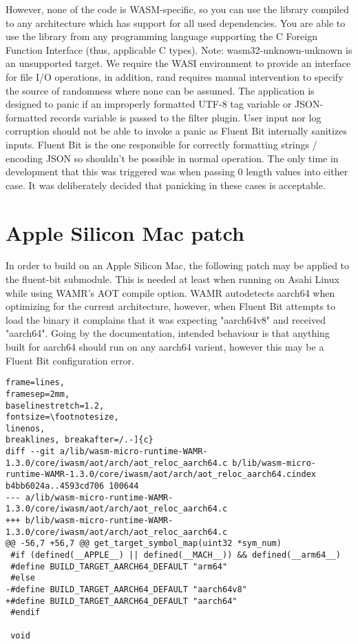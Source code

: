 However, none of the code is WASM-specific, so you can use the library compiled to any architecture which has support for all used dependencies. You are able to use the library from any programming language supporting the C Foreign Function Interface (thus, applicable C types). Note: wasm32-unknown-unknown is an unsupported target. We require the WASI environment to provide an interface for file I/O operations, in addition, rand requires manual intervention to specify the source of randomness where none can be assumed. The application is designed to panic if an improperly formatted UTF-8 tag variable or JSON-formatted records variable is passed to the filter plugin. User input nor log corruption should not be able to invoke a panic as Fluent Bit internally sanitizes inputs. Fluent Bit is the one responsible for correctly formatting strings / encoding JSON so shouldn't be possible in normal operation. The only time in development that this was triggered was when passing 0 length values into either case. It was deliberately decided that panicking in these cases is acceptable.

\section{Apple Silicon Mac patch}
In order to build on an Apple Silicon Mac, the following patch may be applied to the fluent-bit submodule. This is needed at least when running on Asahi Linux while using WAMR's AOT compile option. WAMR autodetects aarch64 when optimizing for the current architecture, however, when Fluent Bit attempts to load the binary it complains that it was expecting "aarch64v8" and received "aarch64". Going by the documentation, intended behaviour is that anything built for aarch64 should run on any aarch64 varient, however this may be a Fluent Bit configuration error.
\begin{lstlisting}[caption={Apple Silicon patch}]
frame=lines,
framesep=2mm,
baselinestretch=1.2,
fontsize=\footnotesize,
linenos,
breaklines, breakafter=/.-]{c}
diff --git a/lib/wasm-micro-runtime-WAMR-1.3.0/core/iwasm/aot/arch/aot_reloc_aarch64.c b/lib/wasm-micro-runtime-WAMR-1.3.0/core/iwasm/aot/arch/aot_reloc_aarch64.cindex b4bb6024a..4593cd706 100644
--- a/lib/wasm-micro-runtime-WAMR-1.3.0/core/iwasm/aot/arch/aot_reloc_aarch64.c
+++ b/lib/wasm-micro-runtime-WAMR-1.3.0/core/iwasm/aot/arch/aot_reloc_aarch64.c
@@ -56,7 +56,7 @@ get_target_symbol_map(uint32 *sym_num)
 #if (defined(__APPLE__) || defined(__MACH__)) && defined(__arm64__)
 #define BUILD_TARGET_AARCH64_DEFAULT "arm64"
 #else
-#define BUILD_TARGET_AARCH64_DEFAULT "aarch64v8"
+#define BUILD_TARGET_AARCH64_DEFAULT "aarch64"
 #endif
 
 void
\end{lstlisting}